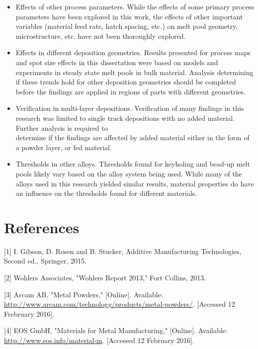 \documentclass[10pt]{article}
\begin{document}
\begin{itemize}
  \item Effects of other process parameters. While the effects of some primary process parameters have been explored in this work, the effects of other important variables (material feed rate, hatch spacing, etc.) on melt pool geometry, microstructure, etc. have not been thoroughly explored.

  \item Effects in different deposition geometries. Results presented for process maps and spot size effects in this dissertation were based on models and experiments in steady state melt pools in bulk material. Analysis determining if these trends hold for other deposition geometries should be completed before the findings are applied in regions of parts with different geometries.

  \item Verification in multi-layer depositions. Verification of many findings in this research was limited to single track depositions with no added material. Further analysis is required to\\
determine if the findings are affected by added material either in the form of a powder layer, or fed material.

  \item Thresholds in other alloys. Thresholds found for keyholing and bead-up melt pools likely vary based on the alloy system being used. While many of the alloys used in this research yielded similar results, material properties do have an influence on the thresholds found for different materials.

\end{itemize}

\section*{References}
[1] I. Gibson, D. Rosen and B. Stucker, Additive Manufacturing Technologies, Second ed., Springer, 2015.

[2] Wohlers Associates, "Wohlers Report 2013," Fort Collins, 2013.

[3] Arcam AB, "Metal Powders," [Online]. Available: \href{http://www.arcam.com/technology/products/metal-powders/}{http://www.arcam.com/technology/products/metal-powders/}. [Accessed 12 Frebruary 2016].

[4] EOS GmbH, "Materials for Metal Manufacturing," [Online]. Available: \href{http://www.eos.info/material-m}{http://www.eos.info/material-m}. [Accessed 12 February 2016].
\end{document}
